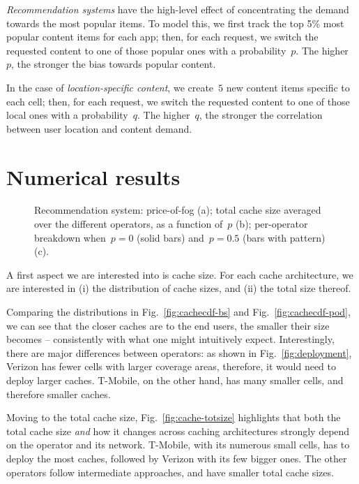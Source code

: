 \documentclass{sig-alternate-05-2015}
\newcommand{\Fig}[1]{Fig.~\ref{fig:#1}}
\begin{document}
\noindent
{\em Recommendation systems} have the high-level effect of concentrating the demand towards the most popular items. To model this, we first track the top 5\% most popular content items for each app; then, for each request, we switch the requested content to one of those popular ones with a probability~$p$. The higher~$p$, the stronger the bias towards popular content.

\noindent
In the case of {\em location-specific content}, we create~$5$ new content items specific to each cell; then, for each request, we switch the requested content to one of those local ones with a probability~$q$. The higher~$q$, the stronger the correlation between user location and content demand.

\section{Numerical results}
\label{sec:results}

\begin{figure*}[]
\centering
{}   \caption{Recommendation system: price-of-fog (a); total cache size averaged
over the different operators, as a function of~$p$ (b); per-operator breakdown when~$p=0$ (solid bars) and~$p=0.5$ (bars with pattern) (c).
\vspace*{-3mm}
} \end{figure*}

A first aspect we are interested into is cache size. For each cache architecture, we are interested in (i) the distribution of cache sizes, and (ii) the total size thereof.

Comparing the distributions in \Fig{cachecdf-bs} and
\Fig{cachecdf-pod}, we can see that the closer caches are to the end users, the smaller their size becomes -- consistently with what one might intuitively expect.
Interestingly,
there are major differences between operators: as shown in
\Fig{deployment}, Verizon has fewer cells with larger coverage areas,
therefore, it would need to deploy larger caches. T-Mobile, on the other hand, has many smaller cells, and therefore smaller caches.

Moving to the total cache size, \Fig{cache-totsize} highlights that both the total cache size {\em and} how it changes across caching architectures strongly depend on the operator and its network. T-Mobile, with its numerous small cells, has to deploy the most caches, followed by Verizon with its few bigger ones. The other operators follow intermediate approaches, and have smaller total cache sizes.
\end{document}
